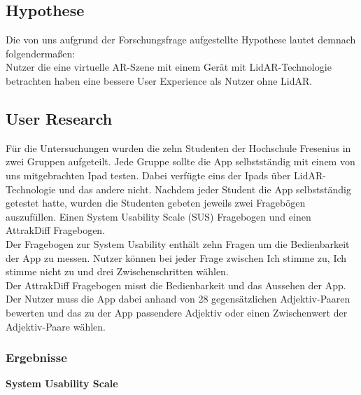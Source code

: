 \documentclass[titlepage, a4paper, 11pt]{scrartcl}
\begin{document}
  \subsection{Hypothese}
  Die von uns aufgrund der Forschungsfrage aufgestellte Hypothese lautet demnach folgendermaßen:\\

  \glqq Nutzer die eine virtuelle AR-Szene mit einem Gerät mit LidAR-Technologie betrachten haben eine bessere User Experience als Nutzer ohne LidAR. \grqq{}
  \subsection{User Research}
  Für die Untersuchungen wurden die zehn Studenten der Hochschule Fresenius in zwei Gruppen aufgeteilt. Jede Gruppe sollte die App selbstständig mit einem von uns mitgebrachten Ipad testen. Dabei verfügte eins der Ipads über LidAR-Technologie und das andere nicht. Nachdem jeder Student die App selbstständig getestet hatte, wurden die Studenten gebeten jeweils zwei Fragebögen auszufüllen. Einen System Usability Scale (SUS) \cite{SUS} Fragebogen und einen AttrakDiff \cite{AttrakDiff} Fragebogen.\\ 
  Der Fragebogen zur System Usability enthält zehn Fragen um die Bedienbarkeit der App zu messen. Nutzer können bei jeder Frage zwischen \glqq Ich stimme zu\grqq, \glqq Ich stimme nicht zu\grqq{} und drei Zwischenschritten wählen.\\ 
  Der AttrakDiff Fragebogen misst die Bedienbarkeit und das Aussehen der App. Der Nutzer muss die App dabei anhand von 28 gegensätzlichen Adjektiv-Paaren bewerten und das zu der App passendere Adjektiv oder einen Zwischenwert der Adjektiv-Paare wählen.

  \subsubsection{Ergebnisse}
  \textbf{System Usability Scale}\\

\end{document}
